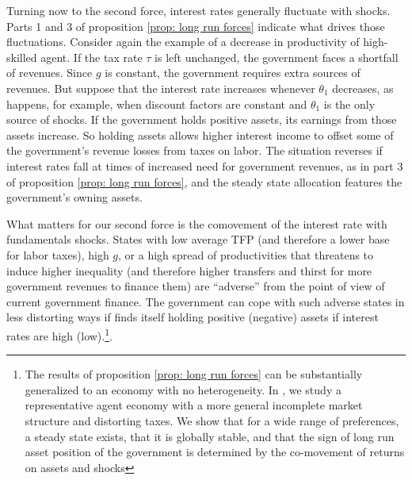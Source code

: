 \documentclass[thmsb,11pt]{article}
\begin{document}

Turning now to the second force,  interest rates generally fluctuate
with  shocks.  Parts 1 and 3 of  proposition \ref{prop: long run forces} indicate what drives those  fluctuations. Consider again the example of a
decrease in productivity of high-skilled agent. If the  tax rate  $\tau $ is left unchanged,
the government faces a shortfall of revenues. Since
$g$ is constant, the
government requires  extra sources of revenues. But  suppose that
the interest rate increases whenever $\theta_1 $ decreases, as happens, for
example, when  discount factors are
constant and $\theta_1 $ is the only source of shocks. If the government holds positive assets, its earnings from those assets increase.
 So holding assets allows higher interest income
 to offset some of the government's revenue losses from taxes on labor.  The situation reverses if interest rates fall at
times of increased need for government revenues, as in
 part 3 of  proposition \ref{prop: long run forces}, and the steady state allocation features the government's owning assets.


 What matters for our second force is the comovement of the interest rate with fundamentals shocks. States with low average TFP (and therefore a lower base for labor taxes), high $g$, or a high spread of productivities that threatens to induce higher inequality (and therefore higher  transfers and thirst for more  government  revenues to finance them) are ``adverse'' from the point of view of current government finance. The government can cope with such adverse states in less distorting ways if finds itself holding positive (negative) assets if interest rates are  high (low).\footnote{The results of proposition \ref{prop: long run forces} can be substantially generalized to an economy with no heterogeneity. In \citet{BEGS2}, we study a representative agent economy with a more general incomplete market structure and distorting taxes. We show that for a wide range of preferences, a steady state exists, that it is globally stable, and that the sign of long run asset position of the government is determined by the co-movement of returns on assets and shocks}.
\end{document}
